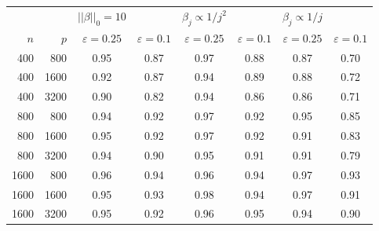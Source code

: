\begin{table}[ht]
\centering
\begin{tabular}{|rr|cc|cc|cc|}
   \hline
 &  & $||\beta||_0 = 10$ &  & $\beta_j \propto 1/j^2$ &  & $\beta_j \propto 1/j$ &  \\ 
  $n$ & $p$ & $\varepsilon = 0.25$ & $\varepsilon = 0.1$ & $\varepsilon = 0.25$ & $\varepsilon = 0.1$ & $\varepsilon = 0.25$ & $\varepsilon = 0.1$ \\ 
   \hline
400 & 800 & 0.95 & 0.87 & 0.97 & 0.88 & 0.87 & 0.70 \\ 
  400 & 1600 & 0.92 & 0.87 & 0.94 & 0.89 & 0.88 & 0.72 \\ 
  400 & 3200 & 0.90 & 0.82 & 0.94 & 0.86 & 0.86 & 0.71 \\ 
   \hline
800 & 800 & 0.94 & 0.92 & 0.97 & 0.92 & 0.95 & 0.85 \\ 
  800 & 1600 & 0.95 & 0.92 & 0.97 & 0.92 & 0.91 & 0.83 \\ 
  800 & 3200 & 0.94 & 0.90 & 0.95 & 0.91 & 0.91 & 0.79 \\ 
   \hline
1600 & 800 & 0.96 & 0.94 & 0.96 & 0.94 & 0.97 & 0.93 \\ 
  1600 & 1600 & 0.95 & 0.93 & 0.98 & 0.94 & 0.97 & 0.91 \\ 
  1600 & 3200 & 0.95 & 0.92 & 0.96 & 0.95 & 0.94 & 0.90 \\ 
   \hline
\end{tabular}
\end{table}
